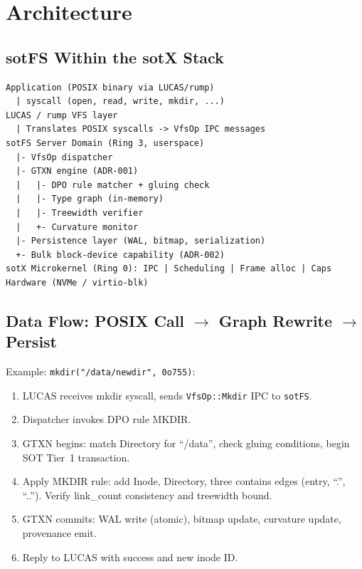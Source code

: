\documentclass[11pt,a4paper,twoside]{report}
\theoremstyle{definition}
\newcommand{\sotFS}{\texttt{sotFS}}
\begin{document}
\chapter{Architecture}

\section{sotFS Within the sotX Stack}

\begin{lstlisting}[language={},frame=single]
Application (POSIX binary via LUCAS/rump)
  | syscall (open, read, write, mkdir, ...)
LUCAS / rump VFS layer
  | Translates POSIX syscalls -> VfsOp IPC messages
sotFS Server Domain (Ring 3, userspace)
  |- VfsOp dispatcher
  |- GTXN engine (ADR-001)
  |   |- DPO rule matcher + gluing check
  |   |- Type graph (in-memory)
  |   |- Treewidth verifier
  |   +- Curvature monitor
  |- Persistence layer (WAL, bitmap, serialization)
  +- Bulk block-device capability (ADR-002)
sotX Microkernel (Ring 0): IPC | Scheduling | Frame alloc | Caps
Hardware (NVMe / virtio-blk)
\end{lstlisting}

\section{Data Flow: POSIX Call $\to$ Graph Rewrite $\to$ Persist}

Example: \texttt{mkdir("/data/newdir", 0o755)}:
\begin{enumerate}
\item LUCAS receives mkdir syscall, sends \texttt{VfsOp::Mkdir} IPC to \sotFS{}.
\item Dispatcher invokes DPO rule MKDIR.
\item GTXN begins: match Directory for ``/data'', check gluing conditions,
  begin SOT Tier~1 transaction.
\item Apply MKDIR rule: add Inode, Directory, three contains edges
  (entry, ``.'', ``..''). Verify link\_count consistency and treewidth bound.
\item GTXN commits: WAL write (atomic), bitmap update, curvature update,
  provenance emit.
\item Reply to LUCAS with success and new inode ID.
\end{enumerate}

\end{document}
